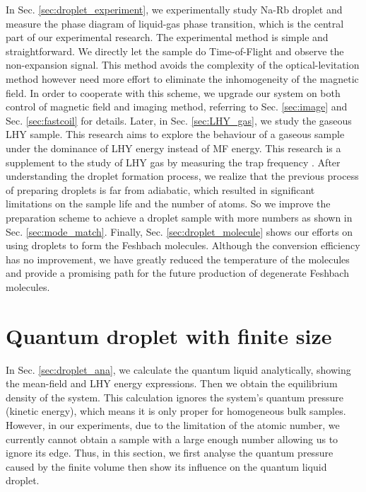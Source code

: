 In Sec. \ref{sec:droplet_experiment}, we experimentally study Na-Rb droplet and measure the phase diagram of liquid-gas phase transition, which is the central part of our experimental research. The experimental method is simple and straightforward. We directly let the sample do Time-of-Flight and observe the non-expansion signal. This method avoids the complexity of the optical-levitation method however need more effort to eliminate the inhomogeneity of the magnetic field. In order to cooperate with this scheme, we upgrade our system on both control of magnetic field and imaging method, referring to Sec. \ref{sec:image} and Sec. \ref{sec:fastcoil} for details. Later, in Sec. \ref{sec:LHY_gas}, we study the gaseous LHY sample. This research aims to explore the behaviour of a gaseous sample under the dominance of LHY energy instead of MF energy. This research is a supplement to the study of LHY gas by measuring the trap frequency \cite{skov2020}. After understanding the droplet formation process, we realize that the previous process of preparing droplets is far from adiabatic, which resulted in significant limitations on the sample life and the number of atoms. So we improve the preparation scheme to achieve a droplet sample with more numbers as shown in Sec. \ref{sec:mode_match}. Finally, Sec. \ref{sec:droplet_molecule} shows our efforts on using droplets to form the Feshbach molecules. Although the conversion efficiency has no improvement, we have greatly reduced the temperature of the molecules and provide a promising path for the future production of degenerate Feshbach molecules.


\section{Quantum droplet with finite size}
\label{sec:finite_size}

In Sec. \ref{sec:droplet_ana}, we calculate the quantum liquid analytically, showing the mean-field and LHY energy expressions. Then we obtain the equilibrium density of the system. This calculation ignores the system's quantum pressure (kinetic energy), which means it is only proper for homogeneous bulk samples. However, in our experiments, due to the limitation of the atomic number, we currently cannot obtain a sample with a large enough number allowing us to ignore its edge. Thus, in this section, we first analyse the quantum pressure caused by the finite volume then show its influence on the quantum liquid droplet. 

